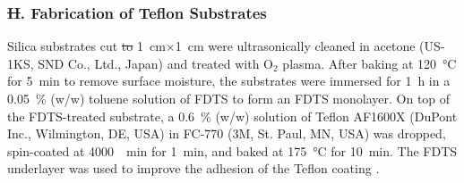 \documentclass[journal=jacsat,manuscript=article]{achemso}
\providecommand{\DIFadd}[1]{{\protect\color{blue}\uwave{#1}}} %
\providecommand{\DIFdel}[1]{{\protect\color{red}\sout{#1}}} %
\providecommand{\DIFaddbegin}{} %
\providecommand{\DIFaddend}{} %
\providecommand{\DIFdelbegin}{} %
\providecommand{\DIFdelend}{} %
\newcommand{\DIFscaledelfig}{0.5}
\newlength{\DIFdelgraphicswidth} %
\newlength{\DIFdelgraphicsheight} %
\newcommand{\DIFaddincludegraphics}[2][]{{\color{blue}\fbox{\DIFOincludegraphics[#1]{#2}}}} %
\newcommand{\DIFdelincludegraphics}[2][]{%
\sbox{\DIFdelgraphicsbox}{\DIFOincludegraphics[#1]{#2}}%
\settoboxwidth{\DIFdelgraphicswidth}{\DIFdelgraphicsbox} %
\settoboxtotalheight{\DIFdelgraphicsheight}{\DIFdelgraphicsbox} %
\scalebox{\DIFscaledelfig}{%
\parbox[b]{\DIFdelgraphicswidth}{\usebox{\DIFdelgraphicsbox}\\[-\baselineskip] \rule{\DIFdelgraphicswidth}{0em}}\llap{\resizebox{\DIFdelgraphicswidth}{\DIFdelgraphicsheight}{%
\setlength{\unitlength}{\DIFdelgraphicswidth}%
\begin{picture}(1,1)%
\thicklines\linethickness{2pt} %
{\color[rgb]{1,0,0}\put(0,0){\framebox(1,1){}}}%
{\color[rgb]{1,0,0}\put(0,0){\line( 1,1){1}}}%
{\color[rgb]{1,0,0}\put(0,1){\line(1,-1){1}}}%
\end{picture}%
}\hspace*{3pt}}} %
} %
\DeclareRobustCommand{\DIFaddbegin}{\DIFOaddbegin \let\includegraphics\DIFaddincludegraphics} %
\DeclareRobustCommand{\DIFaddend}{\DIFOaddend \let\includegraphics\DIFOincludegraphics} %
\DeclareRobustCommand{\DIFdelbegin}{\DIFOdelbegin \let\includegraphics\DIFdelincludegraphics} %
\DeclareRobustCommand{\DIFdelend}{\DIFOaddend \let\includegraphics\DIFOincludegraphics} %
\begin{document}
\subsubsection{\DIFdelbegin \DIFdel{II}\DIFdelend \DIFaddbegin \DIFadd{B}\DIFaddend . Fabrication of Teflon Substrates}

Silica substrates cut \DIFdelbegin \DIFdel{to }\DIFdelend \DIFaddbegin \DIFadd{into }\DIFaddend \SI{1}{\centi\metre}\(\times\)\SI{1}{\centi\metre} were ultrasonically cleaned in acetone (US-1KS, SND Co., Ltd., Japan) and treated with \(\mathrm{O}_2\) plasma. After baking at \SI{120}{\degreeCelsius} for \SI{5}{\minute} to remove surface moisture, the substrates were immersed for \SI{1}{\hour} in a \SI{0.05}{\percent} (w/w) toluene solution of FDTS to form an FDTS monolayer. On top of the FDTS-treated substrate, a \SI{0.6}{\percent} (w/w) solution of Teflon AF1600X (DuPont Inc., Wilmington, DE, USA) in FC-770 (3M, St. Paul, MN, USA) was dropped, spin-coated at \SI{4000}{\per\minute} for \SI{1}{\minute}, and baked at \SI{175}{\degreeCelsius} for \SI{10}{\minute}. The FDTS underlayer was used to improve the adhesion of the Teflon coating \cite{Makohliso1998-av}.
\end{document}
